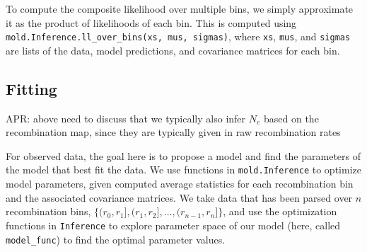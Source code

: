 \documentclass[10pt]{article}
\makeatletter
\newcommand{\comment}[1]{{\color{blue}APR: #1}}
\newcommand{\py}[1]{\lstinline[breaklines=true,language=Python, showstringspaces=False]@#1@}
\makeatother
\begin{document}
To compute the composite likelihood over multiple bins, we simply approximate it as the product of likelihoods of each bin.
This is computed using \py{mold.Inference.ll_over_bins(xs, mus, sigmas)}, where \py{xs}, \py{mus}, and \py{sigmas} are lists of the data, model predictions, and covariance matrices for each bin.

\subsection{Fitting}

\comment{above need to discuss that we typically also infer $N_e$ based on the recombination map, since they are typically given in raw recombination rates}

For observed data, the goal here is to propose a model and find the parameters of the model that best fit the data.
We use functions in \py{mold.Inference} to optimize model parameters, given computed average statistics for each recombination bin and the associated covariance matrices.
We take data that has been parsed over $n$ recombination bins, $\{(r_0,r_1], (r_1,r_2], \ldots, (r_{n-1},r_n]\}$, and use the optimization functions in \py{Inference} to explore parameter space of our model (here, called \py{model_func}) to find the optimal parameter values.
\end{document}
